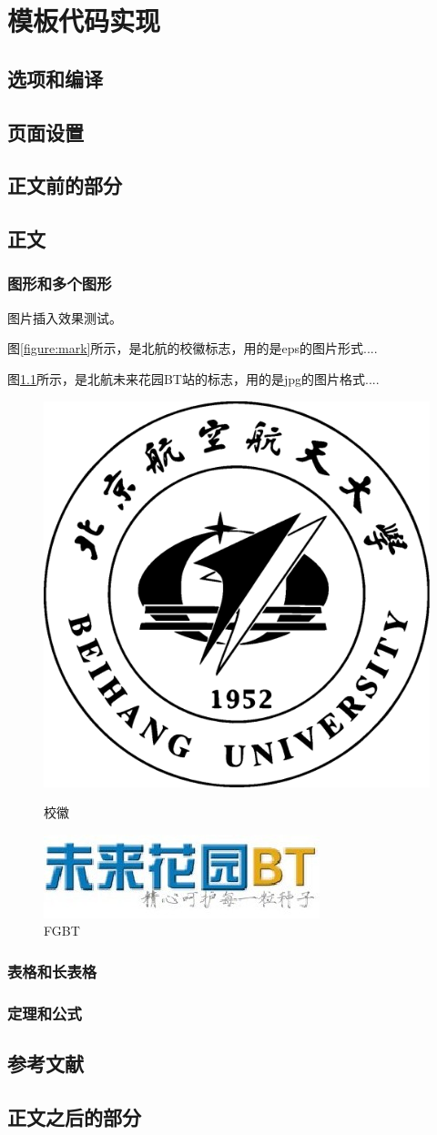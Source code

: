 \chapter{模板代码实现}
    \section{选项和编译}
    \section{页面设置}
    \newpage
    \section{正文前的部分}
    \section{正文}
        \subsection{图形和多个图形}
图片插入效果测试。\par
图\ref{figure:mark}所示，是北航的校徽标志，用的是eps的图片形式....\par
图\ref{figure:fgbt}所示，是北航未来花园BT站的标志，用的是jpg的图片格式....

\begin{figure}[htb!]
\begin{center}
\includegraphics[width=90bp]{figure/buaamark.eps}
\caption{校徽\label{figure:mark}}
\includegraphics[scale=.8]{figure/fgbt.jpg}
\caption{FGBT\label{figure:fgbt}}

\end{center}
\end{figure}
        \subsection{表格和长表格}

        \subsection{定理和公式}
    \newpage
    \section{参考文献}
    \section{正文之后的部分}
